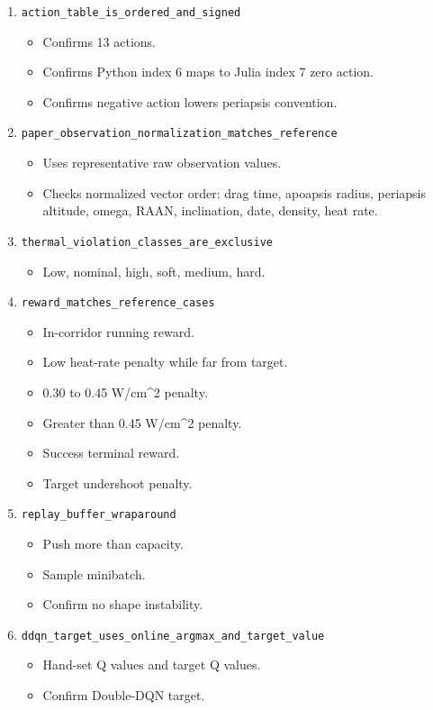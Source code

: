 \documentclass[11pt]{article}
\begin{document}
\begin{enumerate}
\item \texttt{action\_table\_is\_ordered\_and\_signed}
\begin{itemize}
\item Confirms 13 actions.
\item Confirms Python index 6 maps to Julia index 7 zero action.
\item Confirms negative action lowers periapsis convention.

\end{itemize}
\item \texttt{paper\_observation\_normalization\_matches\_reference}
\begin{itemize}
\item Uses representative raw observation values.
\item Checks normalized vector order:
drag time, apoapsis radius, periapsis altitude, omega, RAAN, inclination, date, density, heat rate.

\end{itemize}
\item \texttt{thermal\_violation\_classes\_are\_exclusive}
\begin{itemize}
\item Low, nominal, high, soft, medium, hard.

\end{itemize}
\item \texttt{reward\_matches\_reference\_cases}
\begin{itemize}
\item In-corridor running reward.
\item Low heat-rate penalty while far from target.
\item 0.30 to 0.45 W/cm\textasciicircum{}2 penalty.
\item Greater than 0.45 W/cm\textasciicircum{}2 penalty.
\item Success terminal reward.
\item Target undershoot penalty.

\end{itemize}
\item \texttt{replay\_buffer\_wraparound}
\begin{itemize}
\item Push more than capacity.
\item Sample minibatch.
\item Confirm no shape instability.

\end{itemize}
\item \texttt{ddqn\_target\_uses\_online\_argmax\_and\_target\_value}
\begin{itemize}
\item Hand-set Q values and target Q values.
\item Confirm Double-DQN target.


\end{itemize}
\end{enumerate}
\end{document}
